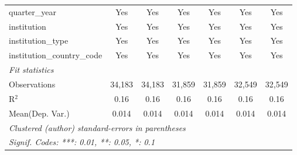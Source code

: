 \begin{tabular}{lcccccc}
   quarter\_year                      & Yes     & Yes      & Yes     & Yes      & Yes     & Yes\\  
   institution                        & Yes     & Yes      & Yes     & Yes      & Yes     & Yes\\  
   institution\_type                  & Yes     & Yes      & Yes     & Yes      & Yes     & Yes\\  
   institution\_country\_code         & Yes     & Yes      & Yes     & Yes      & Yes     & Yes\\  
   \midrule
   \emph{Fit statistics}\\
   Observations                       & 34,183  & 34,183   & 31,859  & 31,859   & 32,549  & 32,549\\  
   R$^2$                              & 0.16    & 0.16     & 0.16    & 0.16     & 0.16    & 0.16\\  
Mean(Dep. Var.) & 0.014 & 0.014 & 0.014 & 0.014 & 0.014 & 0.014 \\
   \midrule \midrule
   \multicolumn{7}{l}{\emph{Clustered (author) standard-errors in parentheses}}\\
   \multicolumn{7}{l}{\emph{Signif. Codes: ***: 0.01, **: 0.05, *: 0.1}}\\
\end{tabular}
\par\endgroup
